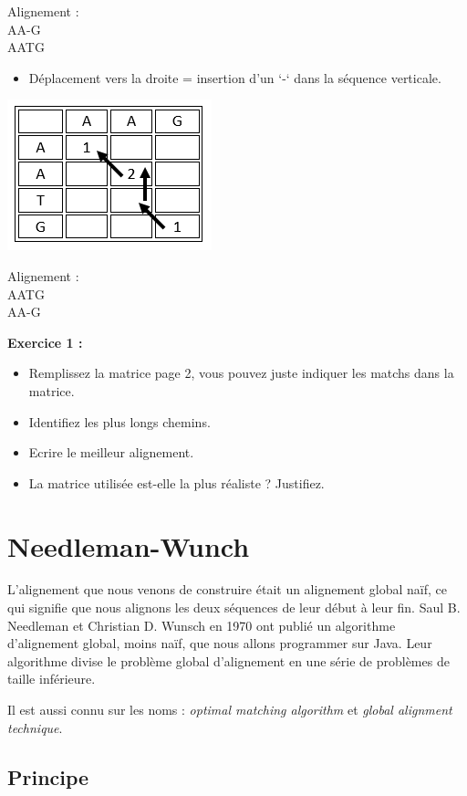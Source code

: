 \documentclass{article}
\begin{document}
Alignement :\\
AA-G\\
AATG

\begin{itemize}
\item Déplacement vers la droite = insertion d’un ‘-‘ dans la séquence verticale.
\end{itemize}
\begin{center}
\includegraphics[]{figures/dep_droite.png}
\end{center}

Alignement :\\
AATG\\
AA-G
\medbreak

\textbf{Exercice 1 :}
\begin{itemize}
\item Remplissez la matrice page 2, vous pouvez juste indiquer les matchs dans la matrice.
\item Identifiez les plus longs chemins.
\item Ecrire le meilleur alignement.
\item La matrice utilisée est-elle la plus réaliste ? Justifiez.
\end{itemize}

\newpage
\section{Needleman-Wunch}
L'alignement que nous venons de construire était un alignement global naïf, ce qui signifie que nous alignons les deux séquences de leur début à leur fin. Saul B. Needleman et Christian D. Wunsch en 1970 ont publié un algorithme d’alignement global, moins naïf, que nous allons programmer sur Java. Leur algorithme divise le problème global d'alignement en une série de problèmes de taille inférieure.

Il est aussi connu sur les noms : \textit{optimal matching algorithm} et \textit{global alignment technique}.

\subsection{Principe}
\end{document}
